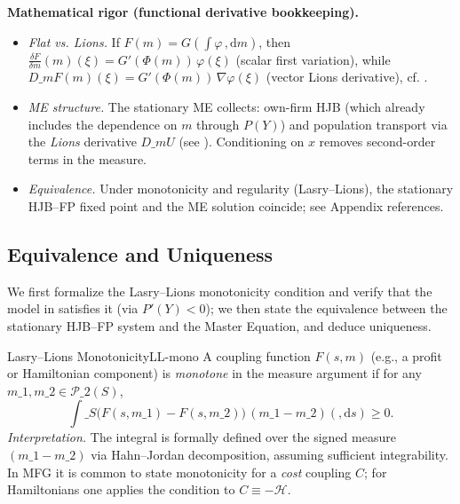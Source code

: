 ﻿\documentclass[11pt,letterpaper,oneside]{article}
\numberwithin{equation}{section}
\newcommand{\ac}[1]{{\mdseries\textsc{#1}}}
\newcommand{\1}{\mathbf{1}}
\newcommand{\diff}{,\mathrm{d}}
\newcommand{\Dm}{D\_m}
\begin{document}
\begin{tcolorbox}[mathstyle]
\textbf{Mathematical rigor (functional derivative bookkeeping).}
\begin{itemize}[leftmargin=1.15em,itemsep=0.25em]
  \item \emph{Flat vs. Lions.} If $F(m)=G\!\left(\int \varphi\,\diff m\right)$, then
  $\tfrac{\delta F}{\delta m}(m)(\xi)=G'(\Phi(m))\,\varphi(\xi)$ (scalar first variation),
  while $\Dm F(m)(\xi)=G'(\Phi(m))\,\nabla\varphi(\xi)$ (vector Lions derivative), cf. .
  \item \emph{ME structure.} The stationary ME collects: own-firm HJB (which already includes the dependence on $m$ through $P(Y)$) and population transport via the \emph{Lions} derivative $\Dm U$ (see ). Conditioning on $x$ removes second-order terms in the measure.
  \item \emph{Equivalence.} Under monotonicity and regularity (Lasry--Lions), the stationary HJB--FP fixed point and the ME solution coincide; see Appendix references.
\end{itemize}
\end{tcolorbox}

\subsection{Equivalence and Uniqueness}\label{sec:master-equation.subsection.7.3}
\noindent We first formalize the Lasry--Lions monotonicity condition and verify that the model in  satisfies it (via $P'(Y)<0$); we then state the equivalence between the stationary \ac{HJB}--\ac{FP} system and the Master Equation, and deduce uniqueness.

\begin{definition}{Lasry--Lions Monotonicity}{LL-mono}
A coupling function $F(s, m)$ (e.g., a profit or Hamiltonian component) is \emph{monotone} in the measure argument if for any $m\_1, m\_2 \in \mathcal{P}\_2(S)$,
\[
\int\_S \big( F(s, m\_1) - F(s, m\_2) \big) \, (m\_1 - m\_2)(\diff s) \ge 0.
\]
\emph{Interpretation.} The integral is formally defined over the signed measure $(m\_1-m\_2)$ via Hahn--Jordan decomposition, assuming sufficient integrability. In MFG it is common to state monotonicity for a \emph{cost} coupling $C$; for Hamiltonians one applies the condition to $C\equiv-\mathcal H$.
\end{definition}
\end{document}
